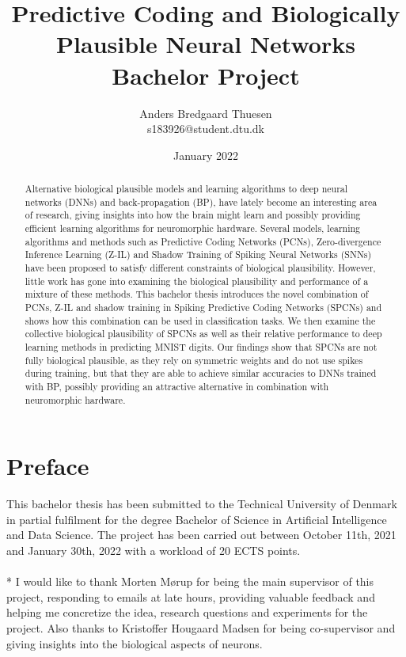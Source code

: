 \documentclass[a4paper,11pt]{article}
\title{
  Predictive Coding and Biologically Plausible Neural Networks \\
  \large{Bachelor Project}
}
\author{Anders Bredgaard Thuesen \\ s183926@student.dtu.dk}
\date{January 2022}
\begin{document}
\maketitle
\thispagestyle{empty}

\newpage
\thispagestyle{empty}
\begin{abstract}  
Alternative biological plausible models and learning algorithms to deep neural networks (DNNs) and back-propagation (BP), have lately become an interesting area of research, giving insights into how the brain might learn and possibly providing efficient learning algorithms for neuromorphic hardware. Several models, learning algorithms and methods such as Predictive Coding Networks (PCNs), Zero-divergence Inference Learning (Z-IL) and Shadow Training of Spiking Neural Networks (SNNs) have been proposed to satisfy different constraints of biological plausibility. However, little work has gone into examining the biological plausibility and performance of a mixture of these methods. 
This bachelor thesis introduces the novel combination of PCNs, Z-IL and shadow training in Spiking Predictive Coding Networks (SPCNs) and shows how this combination can be used in classification tasks. We then examine the collective biological plausibility of SPCNs as well as their relative performance to deep learning methods in predicting MNIST digits. Our findings show that SPCNs are not fully biological plausible, as they rely on symmetric weights and do not use spikes during training, but that they are able to achieve similar accuracies to DNNs trained with BP, possibly providing an attractive alternative in combination with neuromorphic hardware.
\end{abstract}

\newpage 
\thispagestyle{empty}
\section*{Preface}
This bachelor thesis has been submitted to the Technical University of Denmark in partial fulfilment for the degree Bachelor of Science in Artificial Intelligence and Data Science. The project has been carried out between  
October 11th, 2021 and January 30th, 2022 with a workload of 20 ECTS points. \\
\\*
I would like to thank Morten Mørup for being the main supervisor of this project, responding to emails at late hours, providing valuable feedback and helping me concretize the idea, research questions and experiments for the project. Also thanks to Kristoffer Hougaard Madsen for being co-supervisor and giving insights into the biological aspects of neurons. 
\end{document}

